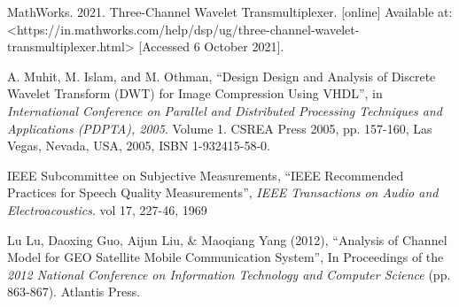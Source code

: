 \begin{thebibliography}{}

MathWorks. 2021. Three-Channel Wavelet Transmultiplexer. [online] Available at: <https://in.mathworks.com/help/dsp/ug/three-channel-wavelet-transmultiplexer.html> [Accessed 6 October 2021].

 A. Muhit, M. Islam, and M. Othman, ``Design Design and Analysis of Discrete Wavelet Transform (DWT) for Image Compression Using VHDL'', in \textit{ International Conference on Parallel and Distributed Processing Techniques and Applications (PDPTA), 2005}. Volume 1. CSREA Press 2005, pp. 157-160, Las Vegas, Nevada, USA, 2005, ISBN 1-932415-58-0. 

 IEEE Subcommittee on Subjective Measurements, ``IEEE Recommended Practices for Speech Quality Measurements'', \textit{IEEE Transactions on Audio and Electroacoustics}. vol 17, 227-46, 1969

 Lu Lu, Daoxing Guo, Aijun Liu, \& Maoqiang Yang (2012), ``Analysis of Channel Model for GEO Satellite Mobile Communication System'', In Proceedings of the \textit{2012 National Conference on Information Technology and Computer Science} (pp. 863-867). Atlantis Press.


\end{thebibliography}
